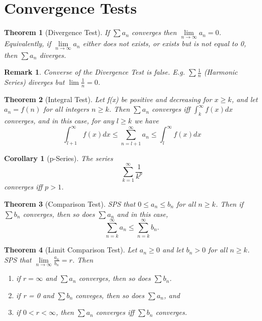 \documentclass[11pt, oneside]{book}
\theoremstyle{break}
\newtheorem{thm}{Theorem}[section]
\newtheorem{crly}{Corollary}[thm]
\newtheorem*{remark}{Remark}
\begin{document}
\section{Convergence Tests}

\begin{thm}[Divergence Test]
	If $\sum a_n$ converges then $\lim\limits_{n \to \infty} a_n = 0$. Equivalently, if $\lim\limits_{n \to \infty} a_n$ either does not exists, or exists but is not equal to 0, then $\sum a_n$ diverges.
\end{thm}

\begin{remark}
	Converse of the Divergence Test is false. E.g. $\sum \frac{1}{n}$ (Harmonic Series) diverges but $\lim\limits \frac{1}{n} = 0$.
\end{remark}

\begin{thm}[Integral Test]
	Let f(x) be positive and decreasing for $x \geq k$, and let $a_n = f(n)$ for all integers $n \geq k$. Then $\sum a_n$ converges iff $\int_{k}^{\infty} f(x) dx$ converges, and in this case, for any $l \geq k$ we have
	\[
		\int_{l + 1}^{\infty} f(x) dx \leq \sum_{n = l + 1}^{\infty} a_n \leq \int_{l}^{\infty} f(x) dx
	\]
\end{thm}

\begin{crly}[p-Series]
	The series
	\[
		\sum_{k = 1}^{\infty} \frac{1}{k^p}
	\]
	converges iff $p > 1$.
\end{crly}

\begin{thm}[Comparison Test]
	SPS that $0 \leq a_n \leq b_n$ for all $n \geq k$. Then if $\sum b_n$ converges, then so does $\sum a_n$ and in this case,
	\[
		\sum_{n = k}^{\infty} a_n \leq \sum_{n = k}^{\infty} b_n.
	\]
\end{thm}

\begin{thm}[Limit Comparison Test]
	Let $a_n \geq 0$ and let $b_n > 0$ for all $n \geq k$. SPS that $\lim\limits_{n \to \infty} \frac{a_n}{b_n} = r$. Then
	\begin{enumerate}
		\item if $r = \infty$ and $\sum a_n$ converges, then so does $\sum b_n$.
		\item if r = 0 and $\sum b_n$ conveges, then so does $\sum a_n$, and
		\item if $0 < r < \infty$, then $\sum a_n$ converges iff $\sum b_n$ converges.
	\end{enumerate}
\end{thm}
\end{document}
